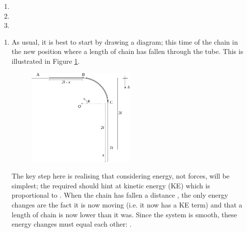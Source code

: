 \begin{problem}
{
\begin{enumerate}
	\item {}
	\item {}%
	\item {}
\end{enumerate}
}
{}
{\begin{enumerate}
	\item As usual, it is best to start by drawing a diagram; this time of the chain in the new position where a length  of chain has fallen through the tube. This is illustrated in Figure \ref{fig:Dynamics_chain_sliding_labelled}.

\begin{figure}[h!]
\centering
\includegraphics[width=0.5\textwidth]{../../../figures/Dynamics_chain_sliding_labelled.svg}
\caption{}
\label{fig:Dynamics_chain_sliding_labelled}
\end{figure}

The key step here is realising that considering energy, not forces, will be simplest; the  required should hint at kinetic energy (KE) which is proportional to . When the chain has fallen a distance , the only energy changes are the fact it is now moving (i.e. it now has a KE term) and that a length  of chain is now lower than it was. Since the system is smooth, these energy changes must equal each other: .


\end{enumerate}}
\end{problem}
